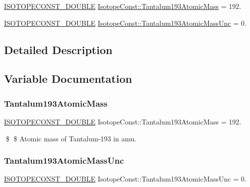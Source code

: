 \begin{DoxyCompactItemize}
\item 
\mbox{\hyperlink{group___isotope_const-_macros_ga8f45a7272ce02c0b4c65c44636ed719a}{I\+S\+O\+T\+O\+P\+E\+C\+O\+N\+S\+T\+\_\+\+D\+O\+U\+B\+LE}} \mbox{\hyperlink{group___isotope_const-_tantalum-_ta193_ga139de06c5d686b56b3d106076c35513c}{Isotope\+Const\+::\+Tantalum193\+Atomic\+Mass}} = 192.
\item 
\mbox{\hyperlink{group___isotope_const-_macros_ga8f45a7272ce02c0b4c65c44636ed719a}{I\+S\+O\+T\+O\+P\+E\+C\+O\+N\+S\+T\+\_\+\+D\+O\+U\+B\+LE}} \mbox{\hyperlink{group___isotope_const-_tantalum-_ta193_ga997c618b0bd5936b9b739b3127be5e76}{Isotope\+Const\+::\+Tantalum193\+Atomic\+Mass\+Unc}} = 0.
\end{DoxyCompactItemize}


\subsection{Detailed Description}


\subsection{Variable Documentation}
\mbox{\label{group___isotope_const-_tantalum-_ta193_ga139de06c5d686b56b3d106076c35513c}} 
\subsubsection{\texorpdfstring{Tantalum193\+Atomic\+Mass}{Tantalum193AtomicMass}}
{\footnotesize\ttfamily \mbox{\hyperlink{group___isotope_const-_macros_ga8f45a7272ce02c0b4c65c44636ed719a}{I\+S\+O\+T\+O\+P\+E\+C\+O\+N\+S\+T\+\_\+\+D\+O\+U\+B\+LE}} Isotope\+Const\+::\+Tantalum193\+Atomic\+Mass = 192.}

\$ \$ Atomic mass of Tantalum-\/193 in amu. \mbox{\label{group___isotope_const-_tantalum-_ta193_ga997c618b0bd5936b9b739b3127be5e76}} 
\subsubsection{\texorpdfstring{Tantalum193\+Atomic\+Mass\+Unc}{Tantalum193AtomicMassUnc}}
{\footnotesize\ttfamily \mbox{\hyperlink{group___isotope_const-_macros_ga8f45a7272ce02c0b4c65c44636ed719a}{I\+S\+O\+T\+O\+P\+E\+C\+O\+N\+S\+T\+\_\+\+D\+O\+U\+B\+LE}} Isotope\+Const\+::\+Tantalum193\+Atomic\+Mass\+Unc = 0.}


